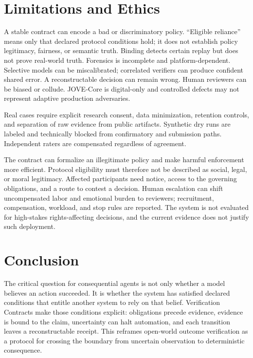 \documentclass[sigconf,anonymous,review]{acmart}
\begin{document}
\section{Limitations and Ethics}
A stable contract can encode a bad or discriminatory policy. ``Eligible reliance'' means only that declared protocol conditions hold; it does not establish policy legitimacy, fairness, or semantic truth. Binding detects certain replay but does not prove real-world truth. Forensics is incomplete and platform-dependent. Selective models can be miscalibrated; correlated verifiers can produce confident shared error. A reconstructable decision can remain wrong. Human reviewers can be biased or collude. JOVE-Core is digital-only and controlled defects may not represent adaptive production adversaries.

Real cases require explicit research consent, data minimization, retention controls, and separation of raw evidence from public artifacts. Synthetic dry runs are labeled and technically blocked from confirmatory and submission paths. Independent raters are compensated regardless of agreement.

The contract can formalize an illegitimate policy and make harmful enforcement more efficient. Protocol eligibility must therefore not be described as social, legal, or moral legitimacy. Affected participants need notice, access to the governing obligations, and a route to contest a decision. Human escalation can shift uncompensated labor and emotional burden to reviewers; recruitment, compensation, workload, and stop rules are reported. The system is not evaluated for high-stakes rights-affecting decisions, and the current evidence does not justify such deployment.

\section{Conclusion}
The critical question for consequential agents is not only whether a model believes an action succeeded. It is whether the system has satisfied declared conditions that entitle another system to rely on that belief. Verification Contracts make those conditions explicit: obligations precede evidence, evidence is bound to the claim, uncertainty can halt automation, and each transition leaves a reconstructable receipt. This reframes open-world outcome verification as a protocol for crossing the boundary from uncertain observation to deterministic consequence.


\end{document}

